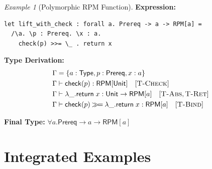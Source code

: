 \documentclass[11pt,twoside,openright]{book}
\theoremstyle{definition}
\theoremstyle{plain}
\theoremstyle{remark}
\newtheorem{example}[definition]{Example}
\newcommand{\rpmret}{\mathsf{return}}
\newcommand{\rpmbind}{\mathbin{\gg\!=}}
\begin{document}
\begin{example}[Polymorphic RPM Function]
\label{ex:poly-rpm}
\textbf{Expression:}
\begin{verbatim}
let lift_with_check : forall a. Prereq -> a -> RPM[a] =
  /\a. \p : Prereq. \x : a.
    check(p) >>= \_ . return x
\end{verbatim}

\textbf{Type Derivation:}
\begin{align}
&\Gamma = \{a : \mathsf{Type}, p : \mathsf{Prereq}, x : a\} \\
&\Gamma \vdash \mathsf{check}(p) : \mathsf{RPM}[\mathsf{Unit}] \quad [\textsc{T-Check}] \\
&\Gamma \vdash \lambda\_. \rpmret\; x : \mathsf{Unit} \to \mathsf{RPM}[a] \quad [\textsc{T-Abs}, \textsc{T-Ret}] \\
&\Gamma \vdash \mathsf{check}(p) \rpmbind \lambda\_. \rpmret\; x : \mathsf{RPM}[a] \quad [\textsc{T-Bind}]
\end{align}

\textbf{Final Type:} $\forall a. \mathsf{Prereq} \to a \to \mathsf{RPM}[a]$
\end{example}

\section{Integrated Examples}
\end{document}

